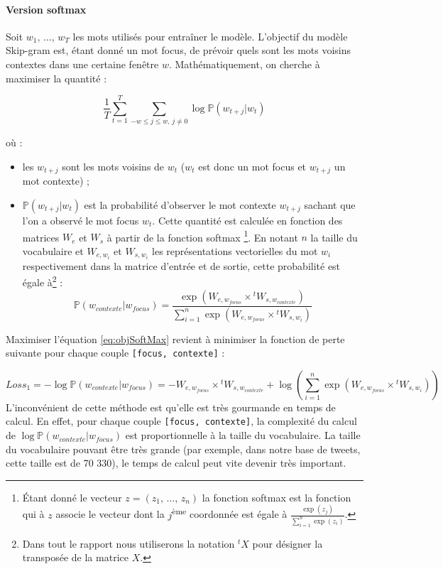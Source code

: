\documentclass[11pt,french,french]{article}
\let\rmarkdownfootnote\footnote%
\def\footnote{\protect\rmarkdownfootnote}
\begin{document}
\paragraph{Version softmax}\label{subsec:softmax}

Soit \(w_1,\,\dots,\,w_T\) les mots utilisés pour entraîner le modèle.
L'objectif du modèle Skip-gram est, étant donné un mot focus, de prévoir
quels sont les mots voisins contextes dans une certaine fenêtre \(w\).
Mathématiquement, on cherche à maximiser la quantité :

\begin{equation}
\frac 1 T\sum_{t=1}^T\sum_{-w\leq j \leq w,\,j\ne 0} \log \mathbb P(w_{t+j}\vert w_{t})
\label{eq:objSoftMax}
\end{equation}

où :

\begin{itemize}
\item
  les \(w_{t+j}\) sont les mots voisins de \(w_t\) (\(w_t\) est donc un
  mot focus et \(w_{t+j}\) un mot contexte) ;
\item
  \(\mathbb P(w_{t+j}\vert w_{t})\) est la probabilité d'observer le mot
  contexte \(w_{t+j}\) sachant que l'on a observé le mot focus \(w_t\).
  Cette quantité est calculée en fonction des matrices \(W_e\) et
  \(W_s\) à partir de la fonction softmax \footnote{Étant donné le
    vecteur \(z=(z_1,\,\dots,\,z_n)\) la fonction softmax est la
    fonction qui à \(z\) associe le vecteur dont la
    \(j\)\textsuperscript{ème} coordonnée est égale à
    \(\frac{\exp(z_j)}{\sum_{i=1}^n\exp(z_i)}\).}. En notant \(n\) la
  taille du vocabulaire et \(W_{e,w_i}\) et \(W_{s,w_i}\) les
  représentations vectorielles du mot \(w_i\) respectivement dans la
  matrice d'entrée et de sortie, cette probabilité est égale à\footnote{Dans
    tout le rapport nous utiliserons la notation \(^{t}X\) pour désigner
    la transposée de la matrice \(X\).} : \[
  \mathbb P(w_{contexte}\vert w_{focus}) = 
  \frac{
  \exp(W_{e,w_{focus}}\times {}^tW_{s,w_{contexte}})
  }{
  \sum_{i=1}^n\exp(W_{e,w_{focus}}\times {}^tW_{s,w_{i}})
  }
  \]
\end{itemize}

Maximiser l'équation \eqref{eq:objSoftMax} revient à minimiser la fonction
de perte suivante pour chaque couple \texttt{{[}focus,\ contexte{]}} :

\[
Loss_{1}=-\log\mathbb P(w_{contexte}\vert w_{focus}) =
-W_{e,w_{focus}}\times {}^tW_{s,w_{contexte}}+
\log\left(\sum_{i=1}^n\exp(W_{e,w_{focus}}\times {}^t W_{s,w_i})\right)
\] L'inconvénient de cette méthode est qu'elle est très gourmande en
temps de calcul. En effet, pour chaque couple
\texttt{{[}focus,\ contexte{]}}, la complexité du calcul de
\(\log\mathbb P(w_{contexte}\vert w_{focus})\) est proportionnelle à la
taille du vocabulaire. La taille du vocabulaire pouvant être très grande
(par exemple, dans notre base de tweets, cette taille est de 70 330), le
temps de calcul peut vite devenir très important.
\end{document}
